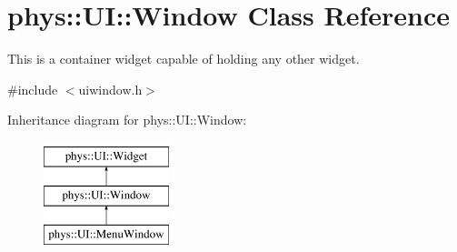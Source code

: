 \hypertarget{classphys_1_1UI_1_1Window}{
\section{phys::UI::Window Class Reference}
\label{d4/d86/classphys_1_1UI_1_1Window}
}


This is a container widget capable of holding any other widget.  




{\ttfamily \#include $<$uiwindow.h$>$}

Inheritance diagram for phys::UI::Window:\begin{figure}[H]
\begin{center}
\leavevmode
\includegraphics[height=3cm]{d4/d86/classphys_1_1UI_1_1Window}
\end{center}
\end{figure}
